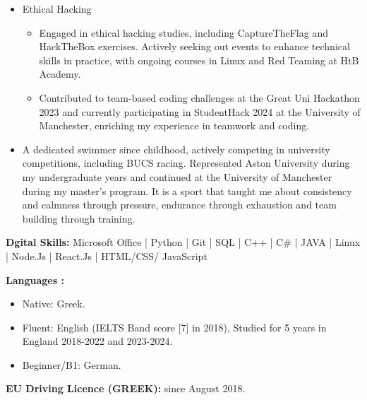 \begin{itemize}
    \item Ethical Hacking
          \begin{itemize}
              \item Engaged in ethical hacking studies, including CaptureTheFlag and HackTheBox exercises. Actively
                    seeking out events to enhance technical skills in practice, with ongoing courses in Linux and Red
                    Teaming at HtB Academy.
              \item Contributed to team-based coding challenges at the Great Uni Hackathon 2023 and currently
                    participating in StudentHack 2024 at the University of Manchester, enriching my experience in
                    teamwork and coding.
          \end{itemize}
    \item A dedicated swimmer since childhood, actively competing in university competitions, including
          BUCS racing. Represented Aston University during my undergraduate years and continued at the University
          of Manchester during my master's program. It is a sport that taught me about consistency and calmness
          through pressure, endurance through exhaustion and team building through training.

\end{itemize}

\vspace{10pt}

\textbf{Dgital Skills:}
Microsoft Office | Python | Git | SQL | C++ | C\# | JAVA | Linux | Node.Js | React.Js | HTML/CSS/
JavaScript

\vspace{10pt}

\textbf{Languages :}
\begin{itemize}
    \item Native: Greek.
    \item Fluent: English (IELTS Band score [7] in 2018), Studied for 5 years in England 2018-2022 and 2023-2024.
    \item Beginner/B1: German.
\end{itemize}

\textbf{EU Driving Licence (GREEK):} since August 2018.
